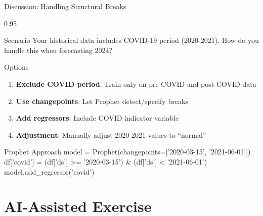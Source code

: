 \documentclass[9pt, aspectratio=169, t]{beamer}
\begin{document}
\begin{frame}{Discussion: Handling Structural Breaks}
    \begin{cminipage}{0.95\textwidth}
    {\small
    \begin{alertblock}{Scenario}
        Your historical data includes COVID-19 period (2020-2021). How do you handle this when forecasting 2024?
    \end{alertblock}
    \begin{block}{Options}
        \begin{enumerate}\setlength{\itemsep}{0pt}
            \item \textbf{Exclude COVID period}: Train only on pre-COVID and post-COVID data
            \item \textbf{Use changepoints}: Let Prophet detect/specify breaks
            \item \textbf{Add regressors}: Include COVID indicator variable
            \item \textbf{Adjustment}: Manually adjust 2020-2021 values to ``normal''
        \end{enumerate}
    \end{block}
    \begin{exampleblock}{Prophet Approach}
        {\scriptsize\ttfamily
        model = Prophet(changepoints=['2020-03-15', '2021-06-01'])\\
        df['covid'] = (df['ds'] >= '2020-03-15') \& (df['ds'] < '2021-06-01')\\
        model.add\_regressor('covid')
        }
    \end{exampleblock}
    }
    \end{cminipage}
\end{frame}

\section{AI-Assisted Exercise}
\end{document}
